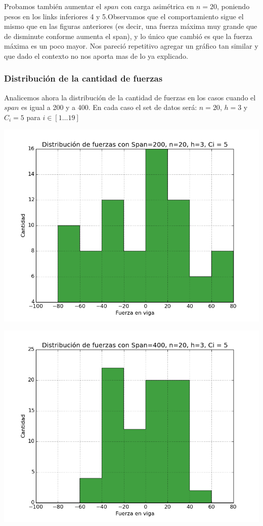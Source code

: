 Probamos también aumentar el $span$ con carga asimétrica en $n = 20$, poniendo pesos en los links inferiores 4 y 5.Observamos que el comportamiento sigue el mismo que en las figuras anteriores (es decir, una fuerza máxima muy grande que de disminute conforme aumenta el span), y lo único que cambió es que la fuerza máxima es un poco mayor. Nos pareció repetitivo agregar un gráfico tan similar y que dado el contexto no nos aporta mas de lo ya explicado.

\subsubsection{Distribución de la cantidad de fuerzas}

Analicemos ahora la distribución de la cantidad de fuerzas en los casos cuando el $span$ es igual a 200 y a 400. En cada caso el set de datos será: $n = 20$, $h = 3$ y $C_i = 5$ para $i \in [1 \dots 19]$

\begin{center}
\includegraphics[scale=0.8]{archivos/graficos/hist_200.png}\\
\end{center}

\begin{center}
\includegraphics[scale=0.8]{archivos/graficos/hist_400.png}\\
\end{center}

